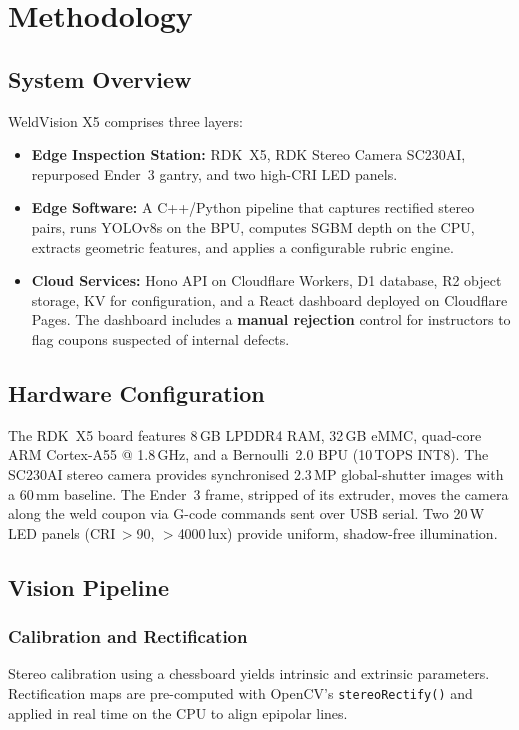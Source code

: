 \documentclass[12pt,a4paper]{article}
\begin{document}
\section{Methodology}

\subsection{System Overview}

WeldVision X5 comprises three layers:
\begin{itemize}[leftmargin=*, itemsep=3pt]
  \item \textbf{Edge Inspection Station:} RDK~X5, RDK Stereo Camera SC230AI, repurposed Ender~3 gantry, and
        two high-CRI LED panels.
  \item \textbf{Edge Software:} A C++/Python pipeline that captures rectified stereo pairs, runs YOLOv8s on
        the BPU, computes SGBM depth on the CPU, extracts geometric features, and applies a configurable
        rubric engine.
  \item \textbf{Cloud Services:} Hono API on Cloudflare Workers, D1 database, R2 object storage, KV for
        configuration, and a React dashboard deployed on Cloudflare Pages. The dashboard includes a
        \textbf{manual rejection} control for instructors to flag coupons suspected of internal defects.
\end{itemize}

\subsection{Hardware Configuration}

The RDK~X5 board features 8\,GB LPDDR4 RAM, 32\,GB eMMC, quad-core ARM Cortex-A55 @ 1.8\,GHz, and a
Bernoulli~2.0 BPU (10\,TOPS INT8). The SC230AI stereo camera provides synchronised 2.3\,MP global-shutter
images with a 60\,mm baseline. The Ender~3 frame, stripped of its extruder, moves the camera along the weld
coupon via G-code commands sent over USB serial. Two 20\,W LED panels (CRI\,$>$90, $>$4000\,lux) provide
uniform, shadow-free illumination.

\subsection{Vision Pipeline}

\subsubsection{Calibration and Rectification}
Stereo calibration using a chessboard \cite{Zhang2000} yields intrinsic and extrinsic parameters.
Rectification maps are pre-computed with OpenCV's \texttt{stereoRectify()} and applied in real time on the
CPU to align epipolar lines.
\end{document}
